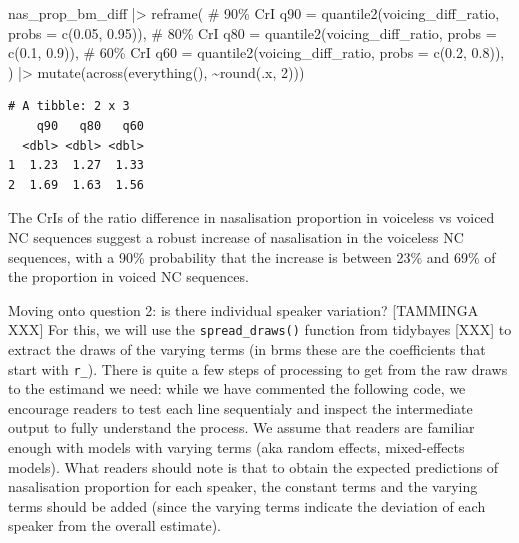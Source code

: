 \documentclass[
  authoryear,
  preprint,
  3p]{elsarticle}
\newenvironment{Shaded}{\begin{snugshade}}{\end{snugshade}}
\newcommand{\AttributeTok}[1]{\textcolor[rgb]{0.40,0.45,0.13}{#1}}
\newcommand{\CommentTok}[1]{\textcolor[rgb]{0.37,0.37,0.37}{#1}}
\newcommand{\DecValTok}[1]{\textcolor[rgb]{0.68,0.00,0.00}{#1}}
\newcommand{\FloatTok}[1]{\textcolor[rgb]{0.68,0.00,0.00}{#1}}
\newcommand{\FunctionTok}[1]{\textcolor[rgb]{0.28,0.35,0.67}{#1}}
\newcommand{\NormalTok}[1]{\textcolor[rgb]{0.00,0.23,0.31}{#1}}
\newcommand{\SpecialCharTok}[1]{\textcolor[rgb]{0.37,0.37,0.37}{#1}}
\begin{document}
\begin{Shaded}
\begin{Highlighting}[]
\NormalTok{nas\_prop\_bm\_diff }\SpecialCharTok{|\textgreater{}} 
  \FunctionTok{reframe}\NormalTok{(}
    \CommentTok{\# 90\% CrI}
    \AttributeTok{q90 =} \FunctionTok{quantile2}\NormalTok{(voicing\_diff\_ratio, }\AttributeTok{probs =} \FunctionTok{c}\NormalTok{(}\FloatTok{0.05}\NormalTok{, }\FloatTok{0.95}\NormalTok{)),}
    \CommentTok{\# 80\% CrI}
    \AttributeTok{q80 =} \FunctionTok{quantile2}\NormalTok{(voicing\_diff\_ratio, }\AttributeTok{probs =} \FunctionTok{c}\NormalTok{(}\FloatTok{0.1}\NormalTok{, }\FloatTok{0.9}\NormalTok{)),}
    \CommentTok{\# 60\% CrI}
    \AttributeTok{q60 =} \FunctionTok{quantile2}\NormalTok{(voicing\_diff\_ratio, }\AttributeTok{probs =} \FunctionTok{c}\NormalTok{(}\FloatTok{0.2}\NormalTok{, }\FloatTok{0.8}\NormalTok{)),}
\NormalTok{  ) }\SpecialCharTok{|\textgreater{}} 
  \FunctionTok{mutate}\NormalTok{(}\FunctionTok{across}\NormalTok{(}\FunctionTok{everything}\NormalTok{(), }\SpecialCharTok{\textasciitilde{}}\FunctionTok{round}\NormalTok{(.x, }\DecValTok{2}\NormalTok{)))}
\end{Highlighting}
\end{Shaded}

\begin{verbatim}
# A tibble: 2 x 3
    q90   q80   q60
  <dbl> <dbl> <dbl>
1  1.23  1.27  1.33
2  1.69  1.63  1.56
\end{verbatim}

The CrIs of the ratio difference in nasalisation proportion in voiceless
vs voiced NC sequences suggest a robust increase of nasalisation in the
voiceless NC sequences, with a 90\% probability that the increase is
between 23\% and 69\% of the proportion in voiced NC sequences.

Moving onto question 2: is there individual speaker variation?
{[}TAMMINGA XXX{]} For this, we will use the \texttt{spread\_draws()}
function from tidybayes {[}XXX{]} to extract the draws of the varying
terms (in brms these are the coefficients that start with \texttt{r\_}).
There is quite a few steps of processing to get from the raw draws to
the estimand we need: while we have commented the following code, we
encourage readers to test each line sequentialy and inspect the
intermediate output to fully understand the process. We assume that
readers are familiar enough with models with varying terms (aka random
effects, mixed-effects models). What readers should note is that to
obtain the expected predictions of nasalisation proportion for each
speaker, the constant terms and the varying terms should be added (since
the varying terms indicate the deviation of each speaker from the
overall estimate).
\end{document}
